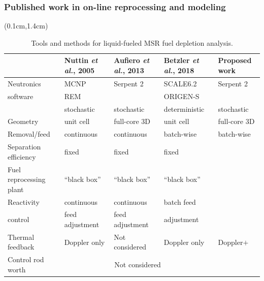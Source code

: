 \begin{frame}
\frametitle{Published work in on-line reprocessing and modeling}

  \begin{textblock*}{12.5cm}(0.1cm,1.4cm) %
	\begin{table}[t]
	\fontsize{6}{9}\selectfont
	\caption{Tools and methods for liquid-fueled \gls{MSR} fuel depletion analysis.}
		\vspace{-2mm}
	\begin{tabularx}{\textwidth}{X X X X p{3cm}} 
		\hline 
		&Nuttin \emph{et al.}, 2005 \cite{nuttin_potential_2005}& Aufiero \emph{et al.}, 
		2013 \cite{aufiero_extended_2013} & Betzler \emph{et al.}, 2018 
		\cite{betzler_fuel_2018}&Proposed work \\ 
		\hline
		Neutronics & \gls{MCNP} & Serpent 2 & SCALE6.2 & Serpent 2 \\
		software         & REM &           & ORIGEN-S &  \\
	                            & stochastic & stochastic & deterministic & stochastic\\[3pt]
		Geometry  & unit cell & full-core 3D & unit cell & full-core 3D\\ [3pt]
		Removal/feed  & continuous &continuous & batch-wise & batch-wise\\[3pt]
                Separation efficiency & fixed & fixed & fixed & \color{red}{function of many parameters} \\[3pt]
                Fuel reprocessing plant & ``black box'' & ``black box'' & ``black box'' & \color{red}{realistic multi-component model} \\[3pt]
                Reactivity & continuous& continuous & batch feed & \color{red}{periodic adjustment of geometry}\\ 
                control  & feed adjustment & feed adjustment & adjustment & \color{red}{and fissile material injection}\\[3pt]
		Thermal feedback & Doppler only & Not considered & Doppler only & Doppler$+$\color{red}{density+thermal expansion}\\[3pt]
		Control rod worth & \multicolumn{3}{c}{Not considered} & \color{red}{For single rod and all rods} \\
		\hline
	\end{tabularx}
	\label{tab:msr_codes}
\end{table}
\end{textblock*}

\end{frame}


